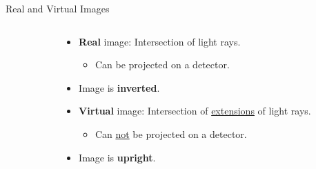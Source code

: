 \begin{frame}{Real and Virtual Images}
\begin{columns}[T,onlytextwidth]
\begin{column}{0.5\textwidth}
		\end{column}

		\begin{column}{0.5\textwidth}
			\centering
			\bigskip
			\begin{itemize}
				\item<7-> \textbf{Real} image: Intersection of light rays.
				      \begin{itemize}\item<8-> Can be projected on a detector.\end{itemize}
				\item<9-> Image is \textbf{inverted}.
				      \vspace*{5mm}
				\item<7-> \textbf{Virtual} image: Intersection of \underline{extensions} of light rays.
				      \begin{itemize}\item<8-> Can \underline{not} be projected on a detector.\end{itemize}
				\item<9-> Image is \textbf{upright}.
			\end{itemize}


		\end{column}
	\end{columns}
\end{frame}

